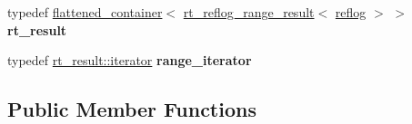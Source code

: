 \begin{DoxyCompactItemize}
typedef \hyperlink{classflattened__container}{flattened\+\_\+container}$<$ \hyperlink{classdialog_1_1index_1_1rt__reflog__range__result}{rt\+\_\+reflog\+\_\+range\+\_\+result}$<$ \hyperlink{classdialog_1_1monolog_1_1monolog__exp2__linear}{reflog} $>$ $>$ {\bfseries rt\+\_\+result}
\item 
\mbox{\label{classdialog_1_1index_1_1radix__tree_adf3672f978967deefb01aa7c3b06bc6e}} 
typedef \hyperlink{classflattened__iterator}{rt\+\_\+result\+::iterator} {\bfseries range\+\_\+iterator}
\end{DoxyCompactItemize}
\subsection*{Public Member Functions}
